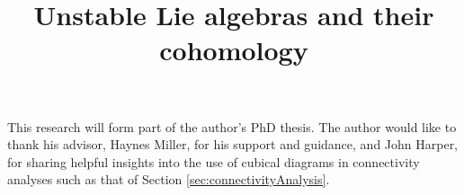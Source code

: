 \documentclass[11pt]{amsart}
\title[Unstable Lie algebras and their cohomology]{Unstable Lie algebras and their cohomology}
\newcommand{\PostponeContents}{}%
\theoremstyle{plain}
\theoremstyle{definition}
\theoremstyle{plain}
\begin{document}
\newcommand{\todo}[2]{\begin{shaded}\begin{itemize}
\setlength{\parindent}{.25in}
\item[{\Large$\smash\diamondsuit$}] #1
\ifblank{#2}{}{\tiny\begin{itemize}
\setlength{\parindent}{.25in}
\item #2
\end{itemize}}
\end{itemize}\end{shaded}
}
\newcommand{\tododone}[2]{}
\newcommand{\todoeasy}[2]{\begin{shaded}\begin{itemize}
\setlength{\parindent}{.25in}
\item[{\Large$\smash\spadesuit$}] #1
\ifblank{#2}{}{\tiny\begin{itemize}
\setlength{\parindent}{.25in}
\item #2
\end{itemize}}
\end{itemize}\end{shaded}
}

\begin{Contents Page}
\ifx\PostponeContents\undefined{\tiny\tableofcontents}\else\relax\fi
\end{Contents Page}

\begin{Intro}
This research will form part of the author's PhD thesis. The author would like to thank his advisor, Haynes Miller, for his support and guidance, and John Harper, for sharing helpful insights into the use of cubical diagrams in connectivity analyses such as that of Section \ref{sec:connectivityAnalysis}.
\end{Intro}
\end{document}
